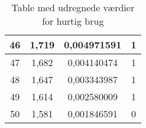 \begin{table}[h]
\begin{tabular}{|c|c|c|c|}
46                                      & 1,719                               & 0,004971591                          & 1                                        \\ \hline
47                                      & 1,682                               & 0,004140474                          & 1                                        \\ \hline
48                                      & 1,647                               & 0,003343987                          & 1                                        \\ \hline
49                                      & 1,614                               & 0,002580009                          & 1                                        \\ \hline
50                                      & 1,581                               & 0,001846591                          & 0                                        \\ \hline
\end{tabular}
\caption{Table med udregnede værdier for hurtig brug}
\label{lookuptable}
\end{table}